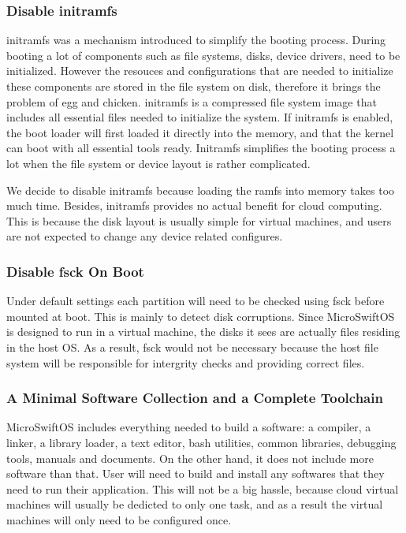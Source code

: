 \subsubsection{Disable initramfs}
initramfs was a mechanism introduced to simplify the booting process. During booting a lot of components such as file systems, disks, device drivers, need to be initialized.
However the resouces and configurations that are needed to initialize these components are stored in the file system on disk, therefore it brings the problem of egg and chicken. initramfs is a compressed file system image that includes all essential files needed to initialize the system. If initramfs is enabled, the boot loader will first loaded it directly into the memory, and that the kernel can boot with all essential tools ready. Initramfs simplifies the booting process a lot when the file system or device layout is rather complicated.

We decide to disable initramfs because loading the ramfs into memory takes too much time. Besides, initramfs provides no actual benefit for cloud computing. This is because the disk layout is usually simple for virtual machines, and users are not expected to change any device related configures.

\subsubsection{Disable fsck On Boot}

Under default settings each partition will need to be checked using fsck before mounted at boot. This is mainly to detect disk corruptions. Since MicroSwiftOS is designed to run in a virtual machine, the disks it sees are actually files residing in the host OS. As a result, fsck would not be necessary because the host file system will be responsible for intergrity checks and providing correct files.

\subsubsection{A Minimal Software Collection and a Complete Toolchain}
MicroSwiftOS includes everything needed to build a software: a compiler, a linker, a library loader, a text editor, bash utilities, common libraries, debugging tools, manuals and documents. On the other hand, it does not include more software than that. User will need to build and install any softwares that they need to run their application. This will not be a big hassle, because cloud virtual machines will usually be dedicted to only one task, and as a result the virtual machines will only need to be configured once.


